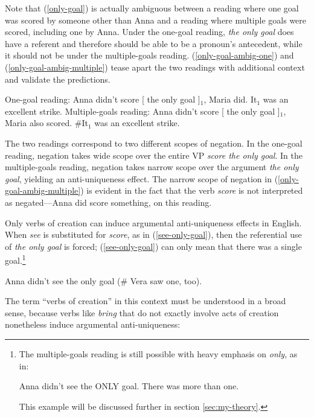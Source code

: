 Note that (\ref{only-goal}) is actually ambiguous between a reading where one goal was scored by someone other than Anna and a reading where multiple goals were scored, including one by Anna. Under the one-goal reading, \textit{the only goal} does have a referent and therefore should be able to be a pronoun's antecedent, while it should not be under the multiple-goals reading. (\ref{only-goal-ambig-one}) and (\ref{only-goal-ambig-multiple}) tease apart the two readings with additional context and validate the predictions.

\begin{exe}
	\ex \label{only-goal-ambig-one} One-goal reading: Anna didn't score [ the only goal ]$_1$, Maria did. It$_1$ was an excellent strike.
	\ex \label{only-goal-ambig-multiple} Multiple-goals reading: Anna didn't score [ the only goal ]$_1$, Maria also scored. \#It$_1$ was an excellent strike.
\end{exe}

The two readings correspond to two different scopes of negation. In the one-goal reading, negation takes wide scope over the entire VP \textit{score the only goal}. In the multiple-goals reading, negation takes narrow scope over the argument \textit{the only goal}, yielding an anti-uniqueness effect. The narrow scope of negation in (\ref{only-goal-ambig-multiple}) is evident in the fact that the verb \textit{score} is not interpreted as negated---Anna did score something, on this reading.

Only verbs of creation can induce argumental anti-uniqueness effects in English. When \textit{see} is substituted for \textit{score}, as in (\ref{see-only-goal}), then the referential use of \textit{the only goal} is forced; (\ref{see-only-goal}) can only mean that there was a single goal.\footnote{The multiple-goals reading is still possible with heavy emphasis on \textit{only}, as in: \begin{exe} \ex Anna didn't see the ONLY goal. There was more than one. \end{exe} This example will be discussed further in section \ref{sec:my-theory}.}

\begin{exe}
	\ex \label{see-only-goal} Anna didn't see the only goal (\# Vera saw one, too).
\end{exe}

The term ``verbs of creation'' in this context must be understood in a broad sense, because verbs like \textit{bring} that do not exactly involve acts of creation nonetheless induce argumental anti-uniqueness:


